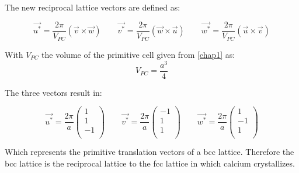 The new reciprocal lattice vectors are defined as:

\begin{equation}
    \vec{u^*} = \frac{2 \pi}{V_{PC}} (\vec{v} \times \vec{w}) \qquad
    \vec{v^*} = \frac{2 \pi}{V_{PC}} (\vec{w} \times \vec{u}) \qquad
    \vec{w^*} = \frac{2 \pi}{V_{PC}} (\vec{u} \times \vec{v})
\end{equation}

With $V_{PC}$ the volume of the primitive cell given from \autoref{chap1}
as:
$$V_{PC} = \frac{a^3}{4}$$

The three vectors result in:

$$
    \vec{u^*} = \frac{2\pi}{a} \left(\begin{matrix}1\\1\\-1\\\end{matrix}\right) \qquad
    \vec{v^*} = \frac{2\pi}{a} \left(\begin{matrix}-1\\1\\1\\\end{matrix}\right) \qquad
    \vec{w^*} = \frac{2\pi}{a} \left(\begin{matrix}1\\-1\\1\\\end{matrix}\right)
$$

Which represents the primitive translation vectors of a bcc lattice.
Therefore the bcc lattice is the reciprocal lattice to the fcc lattice
in which calcium crystallizes.